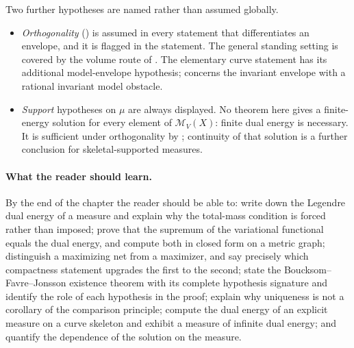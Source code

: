 Two further hypotheses are named rather than assumed globally.

\begin{itemize}
\item \emph{Orthogonality} () is assumed in
every statement that differentiates an envelope, and it is flagged in the
statement.  The general standing setting is covered by the volume route of
.  The elementary curve statement
 has its additional model-envelope
hypothesis;  concerns the invariant
envelope with a rational invariant model obstacle.
\item \emph{Support} hypotheses on $\mu$ are always displayed.  No theorem
here gives a finite-energy solution for every element of
$\mathcal M_V(X)$: finite dual energy is necessary.  It is sufficient under
orthogonality by ; continuity of
that solution is a further conclusion for skeletal-supported measures.
\end{itemize}

\paragraph{What the reader should learn.}
By the end of the chapter the reader should be able to: write down the
Legendre dual energy of a measure and explain why the total-mass condition
is forced rather than imposed; prove that the supremum of the variational
functional equals the dual energy, and compute both in closed form on a
metric graph; distinguish a maximizing net from a maximizer, and say
precisely which compactness statement upgrades the first to the second;
state the Boucksom--Favre--Jonsson existence theorem with its complete
hypothesis signature and identify the role of each hypothesis in the proof;
explain why uniqueness is not a corollary of the comparison principle;
compute the dual energy of an explicit measure on a curve skeleton and
exhibit a measure of infinite dual energy; and quantify the dependence of
the solution on the measure.

